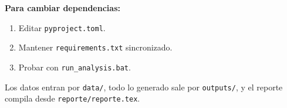 \documentclass[11pt,letterpaper]{article}
\newcommand{\code}[1]{\texttt{#1}}
\begin{document}
\textbf{Para cambiar dependencias:}

\begin{enumerate}
  \item Editar \code{pyproject.toml}.
  \item Mantener \code{requirements.txt} sincronizado.
  \item Probar con \code{run\_analysis.bat}.
\end{enumerate}

\begin{summary}
Los datos entran por \code{data/}, todo lo generado sale
por \code{outputs/}, y el reporte compila desde \code{reporte/reporte.tex}.
\end{summary}
\end{document}

